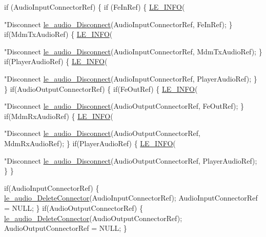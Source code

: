 \begin{DoxyCodeInclude}
{{{{    \textcolor{keywordflow}{if} (AudioInputConnectorRef)
    \{
        \textcolor{keywordflow}{if} (FeInRef)
        \{
            \hyperlink{le__log_8h_a23e6d206faa64f612045d688cdde5808}{LE\_INFO}(\textcolor{stringliteral}{"Disconnect %
            \hyperlink{le__audio__interface_8h_a6b88df9301038375701e4c15a4c8aaf0}{le\_audio\_Disconnect}(AudioInputConnectorRef, FeInRef);
        \}
        \textcolor{keywordflow}{if}(MdmTxAudioRef)
        \{
            \hyperlink{le__log_8h_a23e6d206faa64f612045d688cdde5808}{LE\_INFO}(\textcolor{stringliteral}{"Disconnect %
            \hyperlink{le__audio__interface_8h_a6b88df9301038375701e4c15a4c8aaf0}{le\_audio\_Disconnect}(AudioInputConnectorRef, MdmTxAudioRef);
        \}
        \textcolor{keywordflow}{if}(PlayerAudioRef)
        \{
            \hyperlink{le__log_8h_a23e6d206faa64f612045d688cdde5808}{LE\_INFO}(\textcolor{stringliteral}{"Disconnect %
            \hyperlink{le__audio__interface_8h_a6b88df9301038375701e4c15a4c8aaf0}{le\_audio\_Disconnect}(AudioInputConnectorRef, PlayerAudioRef);
        \}
    \}
    \textcolor{keywordflow}{if}(AudioOutputConnectorRef)
    \{
        \textcolor{keywordflow}{if}(FeOutRef)
        \{
            \hyperlink{le__log_8h_a23e6d206faa64f612045d688cdde5808}{LE\_INFO}(\textcolor{stringliteral}{"Disconnect %
            \hyperlink{le__audio__interface_8h_a6b88df9301038375701e4c15a4c8aaf0}{le\_audio\_Disconnect}(AudioOutputConnectorRef, FeOutRef);
        \}
        \textcolor{keywordflow}{if}(MdmRxAudioRef)
        \{
            \hyperlink{le__log_8h_a23e6d206faa64f612045d688cdde5808}{LE\_INFO}(\textcolor{stringliteral}{"Disconnect %
            \hyperlink{le__audio__interface_8h_a6b88df9301038375701e4c15a4c8aaf0}{le\_audio\_Disconnect}(AudioOutputConnectorRef, MdmRxAudioRef);
        \}
        \textcolor{keywordflow}{if}(PlayerAudioRef)
        \{
            \hyperlink{le__log_8h_a23e6d206faa64f612045d688cdde5808}{LE\_INFO}(\textcolor{stringliteral}{"Disconnect %
            \hyperlink{le__audio__interface_8h_a6b88df9301038375701e4c15a4c8aaf0}{le\_audio\_Disconnect}(AudioOutputConnectorRef, PlayerAudioRef);
        \}
    \}

    \textcolor{keywordflow}{if}(AudioInputConnectorRef)
    \{
        \hyperlink{le__audio__interface_8h_a3f40b13ff980040503927f59bb3e86a9}{le\_audio\_DeleteConnector}(AudioInputConnectorRef);
        AudioInputConnectorRef = NULL;
    \}
    \textcolor{keywordflow}{if}(AudioOutputConnectorRef)
    \{
        \hyperlink{le__audio__interface_8h_a3f40b13ff980040503927f59bb3e86a9}{le\_audio\_DeleteConnector}(AudioOutputConnectorRef);
        AudioOutputConnectorRef = NULL;
    \}

}}}}}}}}}}
\end{DoxyCodeInclude}
